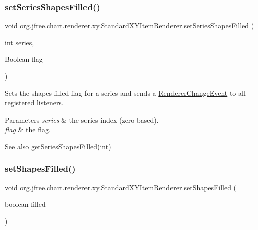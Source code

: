 \subsubsection{\texorpdfstring{set\+Series\+Shapes\+Filled()}{setSeriesShapesFilled()}}
{\footnotesize\ttfamily void org.\+jfree.\+chart.\+renderer.\+xy.\+Standard\+X\+Y\+Item\+Renderer.\+set\+Series\+Shapes\+Filled (\begin{DoxyParamCaption}\item[{int}]{series,  }\item[{Boolean}]{flag }\end{DoxyParamCaption})}

Sets the \textquotesingle{}shapes filled\textquotesingle{} flag for a series and sends a \mbox{\hyperlink{}{Renderer\+Change\+Event}} to all registered listeners.


\begin{DoxyParams}{Parameters}
{\em series} & the series index (zero-\/based). \\
\hline
{\em flag} & the flag.\\
\hline
\end{DoxyParams}
\begin{DoxySeeAlso}{See also}
\mbox{\hyperlink{classorg_1_1jfree_1_1chart_1_1renderer_1_1xy_1_1_standard_x_y_item_renderer_ae5cd12f33b9d935c2536456218d71dcb}{get\+Series\+Shapes\+Filled(int)}} 
\end{DoxySeeAlso}
\mbox{\label{classorg_1_1jfree_1_1chart_1_1renderer_1_1xy_1_1_standard_x_y_item_renderer_add4dc69ddfaab56d17c0ed6e2984a4c1}} 
\subsubsection{\texorpdfstring{set\+Shapes\+Filled()}{setShapesFilled()}\hspace{0.1cm}{\footnotesize\ttfamily [1/2]}}
{\footnotesize\ttfamily void org.\+jfree.\+chart.\+renderer.\+xy.\+Standard\+X\+Y\+Item\+Renderer.\+set\+Shapes\+Filled (\begin{DoxyParamCaption}\item[{boolean}]{filled }\end{DoxyParamCaption})}


